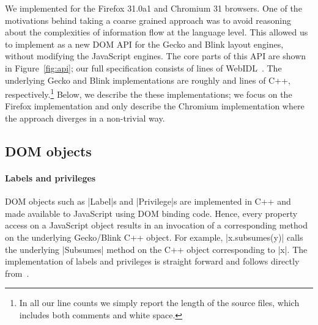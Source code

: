 We implemented \sys{} for the Firefox 31.0a1 and Chromium 31
browsers.
%
One of the motivations behind taking a coarse grained approach was to
avoid reasoning about the complexities of information flow at the
language level.
%
This allowed us to implement \sys{} as a new DOM API for the Gecko and
Blink layout engines, without modifying the JavaScript engines.
%
The core parts of this API are shown in Figure~\ref{fig:api}; our full
specification consists of  lines of WebIDL~\cite{webidl}.
%
The underlying Gecko and Blink implementations are roughly 
and  lines of C++, respectively.\footnote{
  In all our line counts we simply report the length of the source
  files, which includes both comments and white space.
}
%
Below, we describe the these implementations; we focus on the Firefox
implementation and only describe the Chromium implementation where the
approach diverges in a non-trivial way.
%

\subsection{\sys{} DOM objects}

\paragraph{Labels and privileges}
%
DOM objects such as \js|Label|s and \js|Privilege|s are implemented in
C++ and made available to JavaScript using DOM binding code.
%
Hence, every property access on a JavaScript object results in an
invocation of a corresponding method on the underlying Gecko/Blink C++
object.
%
For example, \js|x.subsumes(y)| calls the underlying \js|Subsumes|
method on the C++ object corresponding to \js|x|.
%
The implementation of labels and privileges is straight forward and
follows directly from~\cite{stefan:2011:dclabels}.


